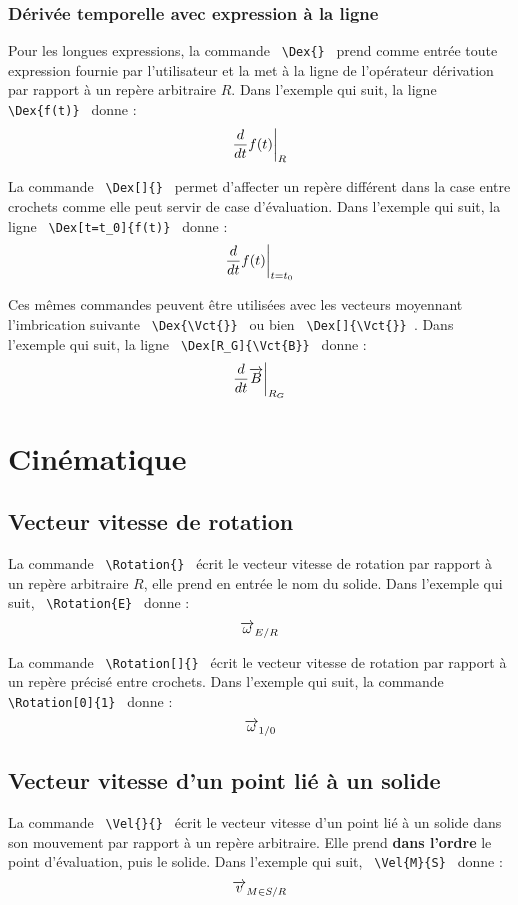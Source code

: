 \documentclass[12pt]{article}
\begin{document}
\subsubsection{Dérivée temporelle avec expression à la ligne}
Pour les longues expressions, la commande \verb| \Dex{} | prend comme entrée toute expression fournie par l'utilisateur et la met à la ligne de l'opérateur dérivation par rapport à un repère arbitraire $R$. Dans l'exemple qui suit, la ligne  \verb| \Dex{f(t)} | donne : $$ \Dex{f(t)} $$

La commande \verb| \Dex[]{} | permet d'affecter un repère différent dans la case entre crochets comme elle peut servir de case d'évaluation. Dans l'exemple qui suit, la ligne  \verb| \Dex[t=t_0]{f(t)} | donne : $$ \Dex[t=t_0]{f(t)} $$

Ces mêmes commandes peuvent être utilisées avec les vecteurs moyennant l'imbrication suivante \verb| \Dex{\Vct{}} | ou bien \verb| \Dex[]{\Vct{}} |. Dans l'exemple qui suit, la ligne  \verb| \Dex[R_G]{\Vct{B}} | donne : $$ \Dex[R_G]{\Vct{B}} $$

\newpage

\section{Cinématique}

\subsection{Vecteur vitesse de rotation}
La commande \verb| \Rotation{} | écrit le vecteur vitesse de rotation par rapport à un repère arbitraire $R$, elle prend en entrée le nom du solide. Dans l'exemple qui suit, \verb| \Rotation{E} | donne : $$\Rotation{E}$$
 
La commande \verb| \Rotation[]{} | écrit le vecteur vitesse de rotation par rapport à un repère précisé entre crochets. Dans l'exemple qui suit, la commande \verb| \Rotation[0]{1} | donne : $$\Rotation[0]{1}$$

\subsection{Vecteur vitesse d'un point lié à un solide}
La commande \verb| \Vel{}{} | écrit le vecteur vitesse d'un point lié à un solide dans son mouvement par rapport à un repère arbitraire. Elle prend \textbf{dans l'ordre} le point d'évaluation, puis le solide. Dans l'exemple qui suit, \verb| \Vel{M}{S} | donne : $$\Vel{M}{S}$$
\end{document}
